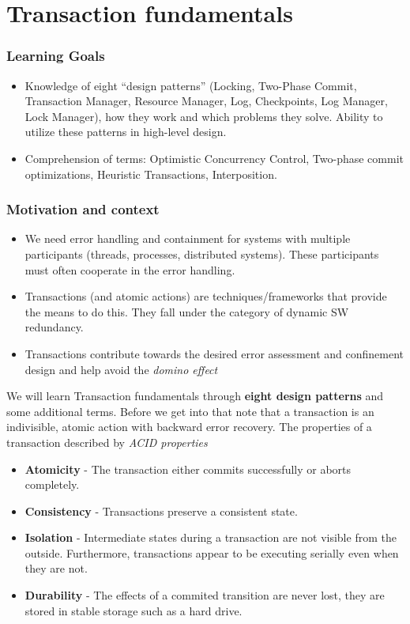 \part{Transaction fundamentals}
\section{Learning Goals}
\begin{itemize}
\item Knowledge of eight “design patterns” (Locking, Two-Phase Commit, Transaction Manager, Resource Manager, Log, Checkpoints, Log Manager, Lock Manager), how they work and which problems they solve. Ability to utilize these patterns in high-level design. 
\item Comprehension of terms: Optimistic Concurrency Control, Two-phase commit optimizations, Heuristic Transactions, Interposition.
\end{itemize}

\section{Motivation and context}
\begin{itemize}
\item We need error handling and containment for systems with multiple participants (threads, processes, distributed systems). These participants must often cooperate in the error handling.
\item Transactions (and atomic actions) are techniques/frameworks that provide the means to do this. They fall under the category of dynamic SW redundancy. 
\item Transactions contribute towards the desired error assessment and confinement design and help avoid the \textit{domino effect}
\end{itemize}

We will learn Transaction fundamentals through \textbf{eight design patterns} and some additional terms. Before we get into that note that a transaction is an indivisible, atomic action with backward error recovery. The properties of a transaction described by \textit{ACID properties}
\begin{itemize}
\item \textbf{Atomicity} -  The transaction either commits successfully or aborts completely.
\item \textbf{Consistency} - Transactions preserve a consistent state.
\item \textbf{Isolation} - Intermediate states during a transaction are not visible from the outside. Furthermore, transactions appear to be executing serially even when they are not.
\item \textbf{Durability} - The effects of a commited transition are never lost, they are stored in stable storage such as a hard drive.
\end{itemize}

